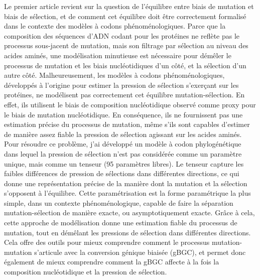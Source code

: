 Le premier article revient sur la question de l'équilibre entre biais de mutation et biais de sélection, et de comment cet équilibre doit être correctement formalisé dans le contexte des modèles à codons phénoménologiques.
Parce que la composition des séquences d'ADN codant pour les protéines ne reflète pas le processus sous-jacent de mutation, mais son filtrage par sélection au niveau des acides aminés, une modélisation minutieuse est nécessaire pour démêler le processus de mutation et les biais nucléotidiques d'un côté, et la sélection d'un autre côté.
Malheureusement, les modèles à codons phénoménologiques, développés à l'origine pour estimer la pression de sélection s’exerçant sur les protéines, ne modélisent pas correctement cet équilibre mutation-sélection.
En effet, ils utilisent le biais de composition nucléotidique observé comme proxy pour le biais de mutation nucléotidique.
En conséquence, ils ne fournissent pas une estimation précise du processus de mutation, même s'ils sont capables d'estimer de manière assez fiable la pression de sélection agissant sur les acides aminés.
Pour résoudre ce problème, j'ai développé un modèle à codon phylogénétique dans lequel la pression de sélection n'est pas considérée comme un paramètre unique, mais comme un tenseur (95 paramètres libres).
Le tenseur capture les faibles différences de pression de sélections dans différentes directions, ce qui donne une représentation précise de la manière dont la mutation et la sélection s'opposent à l'équilibre.
Cette paramétrisation est la forme paramétrique la plus simple, dans un contexte phénoménologique, capable de faire la séparation mutation-sélection de manière exacte, ou asymptotiquement exacte.
Grâce à cela, cette approche de modélisation donne une estimation fiable du processus de mutation, tout en démêlant les pressions de sélection dans différentes directions.
Cela offre des outils pour mieux comprendre comment le processus mutation-mutation s’articule avec la conversion génique biaisée (gBGC), et permet donc également de mieux comprendre comment la gBGC affecte à la fois la composition nucléotidique et la pression de sélection.

